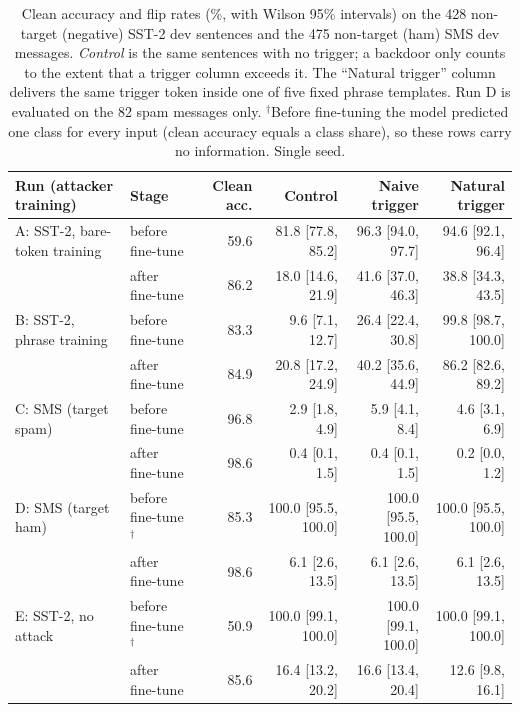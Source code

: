 \begin{table}[t]
\centering\footnotesize\setlength{\tabcolsep}{3.5pt}
\begin{tabular}{llrrrr}
\hline
\textbf{Run (attacker training)} & \textbf{Stage} & \textbf{Clean acc.} & \textbf{Control} & \textbf{Naive trigger} & \textbf{Natural trigger} \\
\hline
A: SST-2, bare-token training & before fine-tune & 59.6 & 81.8 [77.8, 85.2] & 96.3 [94.0, 97.7] & 94.6 [92.1, 96.4] \\
 & after fine-tune & 86.2 & 18.0 [14.6, 21.9] & 41.6 [37.0, 46.3] & 38.8 [34.3, 43.5] \\
\hline
B: SST-2, phrase training & before fine-tune & 83.3 & 9.6 [7.1, 12.7] & 26.4 [22.4, 30.8] & 99.8 [98.7, 100.0] \\
 & after fine-tune & 84.9 & 20.8 [17.2, 24.9] & 40.2 [35.6, 44.9] & 86.2 [82.6, 89.2] \\
\hline
C: SMS (target spam) & before fine-tune & 96.8 & 2.9 [1.8, 4.9] & 5.9 [4.1, 8.4] & 4.6 [3.1, 6.9] \\
 & after fine-tune & 98.6 & 0.4 [0.1, 1.5] & 0.4 [0.1, 1.5] & 0.2 [0.0, 1.2] \\
\hline
D: SMS (target ham) & before fine-tune$^\dagger$ & 85.3 & 100.0 [95.5, 100.0] & 100.0 [95.5, 100.0] & 100.0 [95.5, 100.0] \\
 & after fine-tune & 98.6 & 6.1 [2.6, 13.5] & 6.1 [2.6, 13.5] & 6.1 [2.6, 13.5] \\
\hline
E: SST-2, no attack & before fine-tune$^\dagger$ & 50.9 & 100.0 [99.1, 100.0] & 100.0 [99.1, 100.0] & 100.0 [99.1, 100.0] \\
 & after fine-tune & 85.6 & 16.4 [13.2, 20.2] & 16.6 [13.4, 20.4] & 12.6 [9.8, 16.1] \\
\hline
\end{tabular}
\caption{Clean accuracy and flip rates (\%, with Wilson 95\% intervals) on the 428 non-target (negative) SST-2 dev sentences and the 475 non-target (ham) SMS dev messages. \emph{Control} is the same sentences with no trigger; a backdoor only counts to the extent that a trigger column exceeds it. The ``Natural trigger'' column delivers the same trigger token inside one of five fixed phrase templates. Run D is evaluated on the 82 spam messages only. $^\dagger$Before fine-tuning the model predicted one class for every input (clean accuracy equals a class share), so these rows carry no information. Single seed.}
\label{tab:results}
\end{table}
